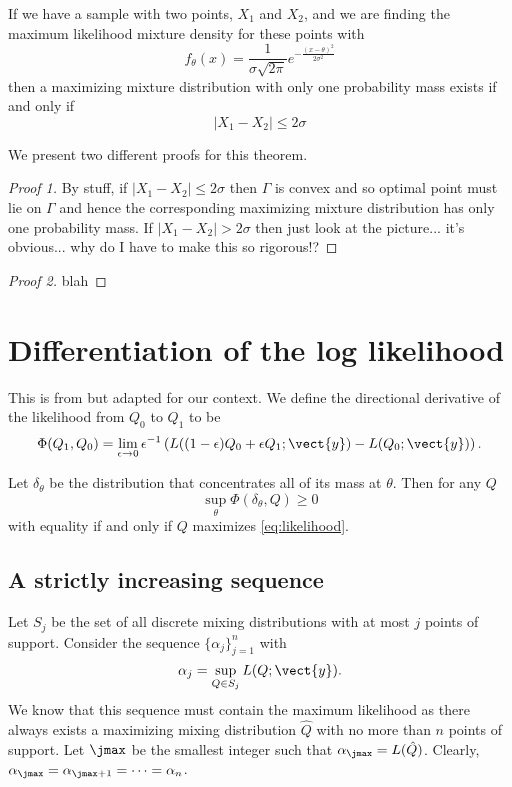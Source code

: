 		\begin{theorem}
			If we have a sample with two points, $X_1$ and $X_2$, and we are finding the maximum likelihood mixture density for these points with 
			$$f_\theta(x) = \frac{1}{\sigma \sqrt{2\pi}} e^{-\frac{(x-\theta)^2}{2\sigma^2}}$$
			then a maximizing mixture distribution with only one probability mass exists if and only if
			$$|X_1 - X_2| \leq 2 \sigma$$
			\label{thm:distancebetweentwopoints}
		\end{theorem}
		We present two different proofs for this theorem.
		\begin{proof}[Proof 1]
			By stuff, if $|X_1 - X_2| \leq 2 \sigma$ then $\Gamma$ is convex and so optimal point must lie on $\Gamma$ and hence the corresponding maximizing mixture distribution has only one probability mass.
			If $|X_1 - X_2| > 2\sigma$ then just look at the picture... it's obvious... why do I have to make this so rigorous!?
		\end{proof}
		\begin{proof}[Proof 2]
			blah
		\end{proof}
	
\section{Differentiation of the log likelihood}
	This is from \cite{Lindsay1983-tf} but adapted for our context. We define the directional derivative of the likelihood from $Q_0$ to $Q_1$ to be
	$$\Phi(Q_1,Q_0) = \lim_{\epsilon \rightarrow 0} \epsilon^{-1} \left( L((1-\epsilon)Q_0 + \epsilon Q_1;\vect{y}) - L(Q_0;\vect{y}) \right).$$
	\begin{theorem}
		\label{thm:thm4point1}
		Let $\delta_\theta$ be the distribution that concentrates all of its mass at $\theta$. Then for any $Q$
		$$\sup_\theta \Phi(\delta_\theta,Q) \geq 0$$
		with equality if and only if $Q$ maximizes \eqref{eq:likelihood}.
	\end{theorem}

	\subsection{A strictly increasing sequence}

	Let $S_j$ be the set of all discrete mixing distributions with at most $j$ points of support. Consider the sequence $\{\alpha_j\}_{j=1}^n$ with
	\begin{equation}
	\alpha_j = \sup_{Q\in S_j} L(Q;\vect{y}).
	\label{eq:sequence}
	\end{equation}
	We know that this sequence must contain the maximum likelihood as there always exists a maximizing mixing distribution $\hat{Q}$ with no more than $n$ points of support. Let $\jmax$ be the smallest integer such that $\alpha_\jmax = L(\hat{Q})$. Clearly, $\alpha_\jmax = \alpha_{\jmax+1} = \dots = \alpha_n$.

